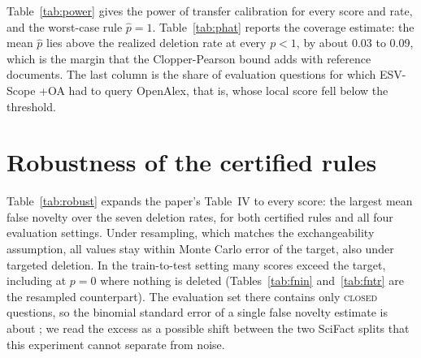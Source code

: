 \documentclass[10pt,a4paper]{article}
\theoremstyle{definition}
\theoremstyle{remark}
\newcommand{\closed}{\textup{\textsc{closed}}}
\begin{document}
\begin{table}[h]
\centering
\caption{Mean false novelty, transfer with estimated $\hat p$ (Theorem~2).}
\label{tab:fntr}

\end{table}

\begin{table}[h]
\centering
\caption{ESV-Scope, mean / 95th percentile of false novelty over the \SuppR{} splits.}
\label{tab:q95}

\end{table}

Table~\ref{tab:power} gives the power of transfer calibration for every score and rate, and the worst-case rule $\hat p=1$. Table~\ref{tab:phat} reports the coverage estimate: the mean $\hat p$ lies above the realized deletion rate at every $p<1$, by about 0.03 to 0.09, which is the margin that the Clopper-Pearson bound adds with \SuppM{} reference documents. The last column is the share of evaluation questions for which ESV-Scope +OA had to query OpenAlex, that is, whose local score fell below the threshold.

\begin{table}[h]
\centering
\caption{Power of transfer calibration (estimated $\hat p$) by deletion rate, and power of the worst-case rule at $p=0.5$.}
\label{tab:power}

\end{table}

\begin{table}[h]
\centering
\caption{Coverage estimate and cost, ESV-Scope, resampled splits, random deletion.}
\label{tab:phat}

\end{table}

\section{Robustness of the certified rules}\label{sec:robust}

Table~\ref{tab:robust} expands the paper's Table~IV to every score: the largest mean false novelty over the seven deletion rates, for both certified rules and all four evaluation settings. Under resampling, which matches the exchangeability assumption, all values stay within Monte Carlo error of the target, also under targeted deletion. In the train-to-test setting many scores exceed the target, including at $p=0$ where nothing is deleted (Tables~\ref{tab:fnin} and~\ref{tab:fntr} are the resampled counterpart). The evaluation set there contains only \NholdClosed{} \closed{} questions, so the binomial standard error of a single false novelty estimate is about \SEhold{}; we read the excess as a possible shift between the two SciFact splits that this experiment cannot separate from noise.
\end{document}
